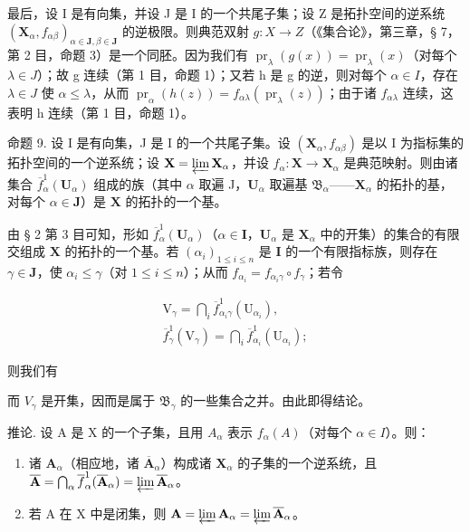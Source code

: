 最后，设 I 是有向集，并设 J 是 I 的一个共尾子集；设 Z 是拓扑空间的逆系统 \((\mathbf{X}_{\alpha}, f_{\alpha\beta})_{\alpha\in\mathbf{J}, \beta\in\mathbf{J}}\) 的逆极限。则典范双射 \(g: X \to Z\)（《集合论》，第三章，§ 7，第 2 目，命题 3）是一个同胚。因为我们有 \(\operatorname{pr}_{\lambda}(g(x)) = \operatorname{pr}_{\lambda}(x)\)（对每个 \(\lambda \in J\)）；故 g 连续（第 1 目，命题 1）；又若 h 是 g 的逆，则对每个 \(\alpha \in I\)，存在 \(\lambda \in J\) 使 \(\alpha \leqslant \lambda\)，从而 \(\operatorname{pr}_{\alpha}(h(z)) = f_{\alpha\lambda}(\operatorname{pr}_{\lambda}(z))\)；由于诸 \(f_{\alpha\lambda}\) 连续，这表明 h 连续（第 1 目，命题 1）。

命题 9. 设 I 是有向集，J 是 I 的一个共尾子集。设 \((\mathbf{X}_{\alpha}, f_{\alpha \beta})\) 是以 I 为指标集的拓扑空间的一个逆系统；设 \(\mathbf{X} = \varprojlim \mathbf{X}_{\alpha}\)，并设 \(f_{\alpha}: \mathbf{X} \to \mathbf{X}_{\alpha}\) 是典范映射。则由诸集合 \(\overline{f}_{\alpha}^{1}(\mathbf{U}_{\alpha})\) 组成的族（其中 \(\alpha\) 取遍 J，\(\mathbf{U}_{\alpha}\) 取遍基 \(\mathfrak{B}_{\alpha}\)——\(\mathbf{X}_{\alpha}\) 的拓扑的基，对每个 \(\alpha \in \mathbf{J}\)）是 \(\mathbf{X}\) 的拓扑的一个基。

由 § 2 第 3 目可知，形如 \(\overline{f}_{\alpha}^{1}(\mathbf{U}_{\alpha})\)（\(\alpha \in \mathbf{I}\)，\(\mathbf{U}_{\alpha}\) 是 \(\mathbf{X}_{\alpha}\) 中的开集）的集合的有限交组成 \(\mathbf{X}\) 的拓扑的一个基。若 \((\alpha_i)_{1 \leqslant i \leqslant n}\) 是 \(\mathbf{I}\) 的一个有限指标族，则存在 \(\gamma \in \mathbf{J}\)，使 \(\alpha_i \leqslant \gamma\)（对 \(1 \leqslant i \leqslant n\)）；从而 \(f_{\alpha_i} = f_{\alpha_i \gamma} \circ f_\gamma\)；若令

\[
\begin{array}{c} \mathrm{V} _ {\gamma} = \bigcap_ {i} \overline {{f}} _ {\alpha_ {i} \gamma} ^ {1} (\mathrm{U} _ {\alpha_ {i}}), \\ \overline {{f}} _ {\gamma} ^ {1} (\mathrm{V} _ {\gamma}) = \bigcap_ {i} \overline {{f}} _ {\alpha_ {i}} ^ {1} (\mathrm{U} _ {\alpha_ {i}}); \end{array}
\]

则我们有

而 \(V_{\gamma}\) 是开集，因而是属于 \(\mathfrak{B}_{\gamma}\) 的一些集合之并。由此即得结论。

推论. 设 A 是 X 的一个子集，且用 \(A_{\alpha}\) 表示 \(f_{\alpha}(A)\)（对每个 \(\alpha \in I\)）。则：

\begin{enumerate}
\def\labelenumi{(\roman{enumi})}
\item
  诸 \(\mathbf{A}_{\alpha}\)（相应地，诸 \(\overline{\mathbf{A}}_{\alpha}\)）构成诸 \(\mathbf{X}_{\alpha}\) 的子集的一个逆系统，且 \(\overline{\mathbf{A}} = \bigcap_{\alpha} \overline{f}_{\alpha}^{1}(\overline{\mathbf{A}}_{\alpha}) = \varprojlim \overline{\mathbf{A}}_{\alpha}\)。
\item
  若 A 在 X 中是闭集，则 \(\mathbf{A} = \varprojlim \mathbf{A}_{\alpha} = \varprojlim \overline{\mathbf{A}}_{\alpha}\)。
\end{enumerate}

